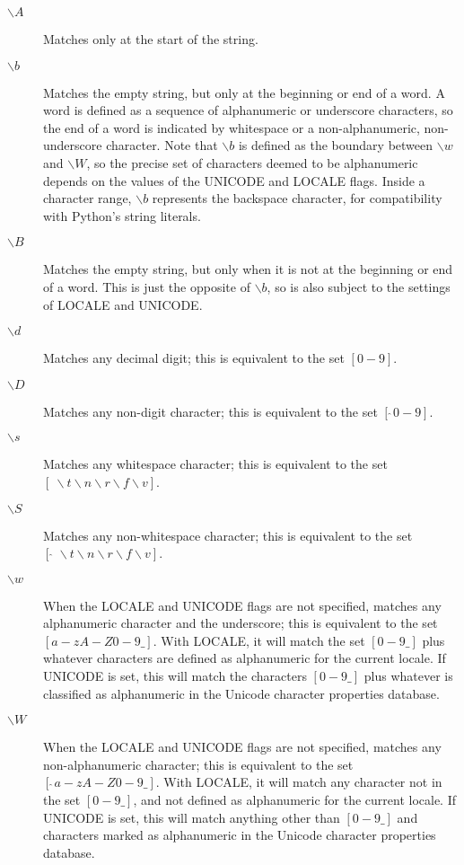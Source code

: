 \begin{description}
    \item [$\backslash A$]
    Matches only at the start of the string.
    \item [$\backslash b$]
    Matches the empty string, but only at the beginning or end of a word. A word is defined as a sequence of alphanumeric or underscore characters, so the end of a word is indicated by whitespace or a non-alphanumeric, non-underscore character. Note that $\backslash b$ is defined as the boundary between $\backslash w$ and $\backslash W$, so the precise set of characters deemed to be alphanumeric depends on the values of the UNICODE and LOCALE flags. Inside a character range, $\backslash b$ represents the backspace character, for compatibility with Python's string literals.
    \item [$\backslash B$]
    Matches the empty string, but only when it is not at the beginning or end of a word. This is just the opposite of $\backslash b$, so is also subject to the settings of LOCALE and UNICODE.
    \item [$\backslash d$]
    Matches any decimal digit; this is equivalent to the set $[0-9]$.
    \item [$\backslash D$]
    Matches any non-digit character; this is equivalent to the set $[\hat{~}0-9]$.
    \item [$\backslash s$]
    Matches any whitespace character; this is equivalent to the set $[~\backslash t\backslash n\backslash r\backslash f\backslash v]$.
    \item [$\backslash S$]
    Matches any non-whitespace character; this is equivalent to the set $[\hat{~}~\backslash t\backslash n\backslash r\backslash f\backslash v]$.
    \item [$\backslash w$]
    When the LOCALE and UNICODE flags are not specified, matches any alphanumeric character and the underscore; this is equivalent to the set $[a-zA-Z0-9\_]$. With LOCALE, it will match the set $[0-9\_]$ plus whatever characters are defined as alphanumeric for the current locale. If UNICODE is set, this will match the characters $[0-9\_]$ plus whatever is classified as alphanumeric in the Unicode character properties database.
    \item [$\backslash W$]
    When the LOCALE and UNICODE flags are not specified, matches any non-alphanumeric character; this is equivalent to the set $[\hat{~}a-zA-Z0-9\_]$. With LOCALE, it will match any character not in the set $[0-9\_]$, and not defined as alphanumeric for the current locale. If UNICODE is set, this will match anything other than $[0-9\_]$ and characters marked as alphanumeric in the Unicode character properties database.

\end{description}
